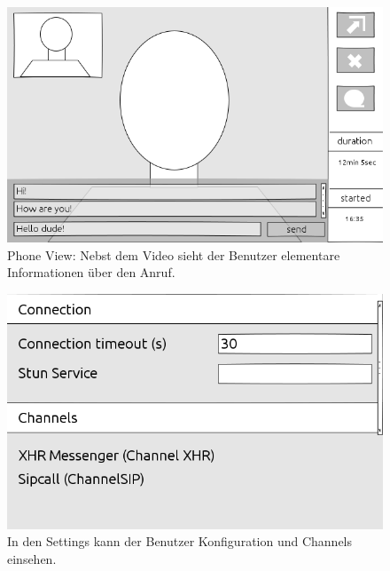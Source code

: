 	\begin{figure}[H]
		\centering
		\includegraphics[height=0.4\textheight]{../ui/img/uiDraft2/PhoneViewWithMessenger.png}
		\caption{Phone View: Nebst dem Video sieht der Benutzer elementare Informationen über den Anruf.}
		\label{settings screen}
	\end{figure}
	\begin{figure}[H]
		\centering
		\includegraphics[height=0.4\textheight]{../ui/img/uiDraft2/SettingsView.png}
		\caption{In den Settings kann der Benutzer Konfiguration und Channels einsehen.}
		\label{settings screen}
	\end{figure}
	
